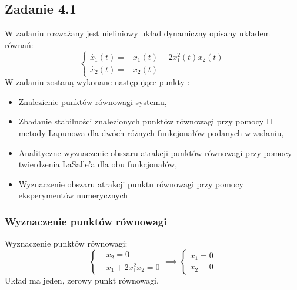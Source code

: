 \documentclass[a4paper,11pt]{article}
\begin{document}
\subsection{Zadanie 4.1}
W zadaniu rozważany jest nieliniowy układ dynamiczny opisany układem równań: 
\begin{equation*}
\begin{cases}
\dot{x_{1}}(t)=-x_{1}(t)+2x_{1}^{2}(t)x_{2}(t) \\
\dot{x_{2}}(t)=-x_{2}(t)
\end{cases}
\end{equation*}
\newpage
W zadaniu zostaną wykonane następujące punkty :
\begin{itemize}
\item Znalezienie punktów równowagi systemu,
\item Zbadanie stabilności znalezionych punktów równowagi przy pomocy II metody Lapunowa dla dwóch różnych funkcjonałów podanych w zadaniu, 
\item Analityczne wyznaczenie obszaru atrakcji punktów równowagi przy pomocy twierdzenia LaSalle'a dla obu funkcjonałów,
\item Wyznaczenie obszaru atrakcji punktu równowagi przy pomocy eksperymentów numerycznych
\end{itemize}
\subsubsection{Wyznaczenie punktów równowagi}
Wyznaczenie punktów równowagi: \\
\begin{equation*}
\begin{cases}
-x_{2}=0 \\
-x_{1}+2x_{1}^{2}x_{2}=0
\end{cases} \implies
\begin{cases}
x_{1}=0 \\
x_{2}=0
\end{cases}
\end{equation*}
Układ ma jeden, zerowy punkt równowagi.
\end{document}
